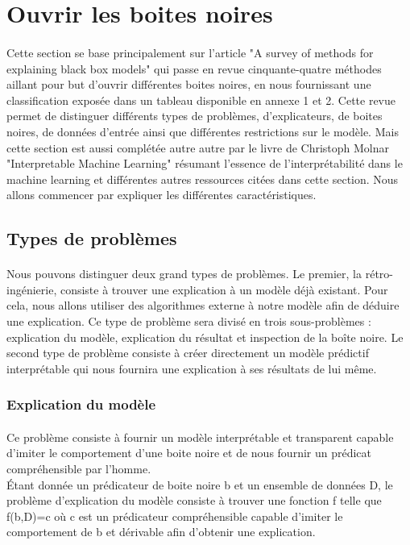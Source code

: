 \section{Ouvrir les boites noires}
\paragraph{}Cette section se base principalement sur l'article "A survey of methods for explaining black box models"\cite{surveyExplaining} qui passe en revue cinquante-quatre méthodes aillant pour but d'ouvrir différentes boites noires, en nous fournissant une classification exposée dans un tableau disponible en annexe 1 et 2. Cette revue permet de distinguer différents types de problèmes, d'explicateurs, de boites noires, de données d'entrée ainsi que différentes restrictions sur le modèle. Mais cette section est aussi complétée autre autre par le livre de Christoph Molnar "Interpretable Machine Learning" \cite{molnar2019} résumant l'essence de l'interprétabilité dans le machine learning et différentes autres ressources citées dans cette section. Nous allons commencer par expliquer les différentes caractéristiques.

\subsection{Types de problèmes}
\paragraph{}Nous pouvons distinguer deux grand types de problèmes. Le premier, la rétro-ingénierie, consiste à trouver une explication à un modèle déjà existant. Pour cela, nous allons utiliser des algorithmes externe à notre modèle afin de déduire une explication. Ce type de problème sera divisé en trois sous-problèmes : explication du modèle, explication du résultat et inspection de la boîte noire. Le second type de problème consiste à créer directement un modèle prédictif interprétable qui nous fournira une explication à ses résultats de lui même.
\subsubsection{Explication du modèle}
\paragraph{}Ce problème consiste à fournir un modèle interprétable et transparent capable d'imiter le comportement d'une boite noire et de nous fournir un prédicat compréhensible par l'homme.\\
Étant donnée un prédicateur de boite noire b et un ensemble de données D, le problème d'explication du modèle consiste à trouver une fonction f telle que f(b,D)=c où c est un prédicateur compréhensible capable d'imiter le comportement de b et dérivable afin d'obtenir une explication.

